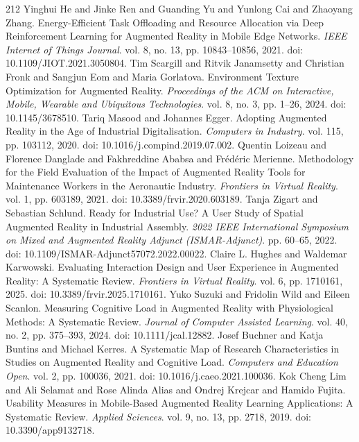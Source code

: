 \begin{thebibliography}{212}
 Yinghui He and Jinke Ren and Guanding Yu and Yunlong Cai and Zhaoyang Zhang. Energy-Efficient Task Offloading and Resource Allocation via Deep Reinforcement Learning for Augmented Reality in Mobile Edge Networks. \emph{IEEE Internet of Things Journal}. vol. 8, no. 13, pp. 10843--10856, 2021. doi: 10.1109/JIOT.2021.3050804.
 Tim Scargill and Ritvik Janamsetty and Christian Fronk and Sangjun Eom and Maria Gorlatova. Environment Texture Optimization for Augmented Reality. \emph{Proceedings of the ACM on Interactive, Mobile, Wearable and Ubiquitous Technologies}. vol. 8, no. 3, pp. 1--26, 2024. doi: 10.1145/3678510.
 Tariq Masood and Johannes Egger. Adopting Augmented Reality in the Age of Industrial Digitalisation. \emph{Computers in Industry}. vol. 115, pp. 103112, 2020. doi: 10.1016/j.compind.2019.07.002.
 Quentin Loizeau and Florence Danglade and Fakhreddine Ababsa and Fr{\'e}d{\'e}ric Merienne. Methodology for the Field Evaluation of the Impact of Augmented Reality Tools for Maintenance Workers in the Aeronautic Industry. \emph{Frontiers in Virtual Reality}. vol. 1, pp. 603189, 2021. doi: 10.3389/frvir.2020.603189.
 Tanja Zigart and Sebastian Schlund. Ready for Industrial Use? A User Study of Spatial Augmented Reality in Industrial Assembly. \emph{2022 IEEE International Symposium on Mixed and Augmented Reality Adjunct (ISMAR-Adjunct)}. pp. 60--65, 2022. doi: 10.1109/ISMAR-Adjunct57072.2022.00022.
 Claire L. Hughes and Waldemar Karwowski. Evaluating Interaction Design and User Experience in Augmented Reality: A Systematic Review. \emph{Frontiers in Virtual Reality}. vol. 6, pp. 1710161, 2025. doi: 10.3389/frvir.2025.1710161.
 Yuko Suzuki and Fridolin Wild and Eileen Scanlon. Measuring Cognitive Load in Augmented Reality with Physiological Methods: A Systematic Review. \emph{Journal of Computer Assisted Learning}. vol. 40, no. 2, pp. 375--393, 2024. doi: 10.1111/jcal.12882.
 Josef Buchner and Katja Buntins and Michael Kerres. A Systematic Map of Research Characteristics in Studies on Augmented Reality and Cognitive Load. \emph{Computers and Education Open}. vol. 2, pp. 100036, 2021. doi: 10.1016/j.caeo.2021.100036.
 Kok Cheng Lim and Ali Selamat and Rose Alinda Alias and Ondrej Krejcar and Hamido Fujita. Usability Measures in Mobile-Based Augmented Reality Learning Applications: A Systematic Review. \emph{Applied Sciences}. vol. 9, no. 13, pp. 2718, 2019. doi: 10.3390/app9132718.

\end{thebibliography}
